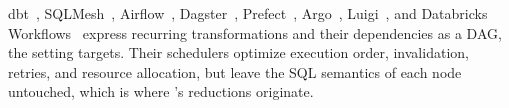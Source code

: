 dbt~\cite{dbtWhatExactly}, SQLMesh~\cite{sqlmeshOverview}, Airflow~\cite{airflowDags}, Dagster~\cite{dagsterAssets}, Prefect~\cite{prefectTasks}, Argo~\cite{argoDag}, Luigi~\cite{luigiDocs}, and Databricks Workflows~\cite{databricksJobs} express recurring transformations and their dependencies as a DAG, the setting \tool targets. Their schedulers optimize execution order, invalidation, retries, and resource allocation, but leave the SQL semantics of each node untouched, which is where \tool's reductions originate.

